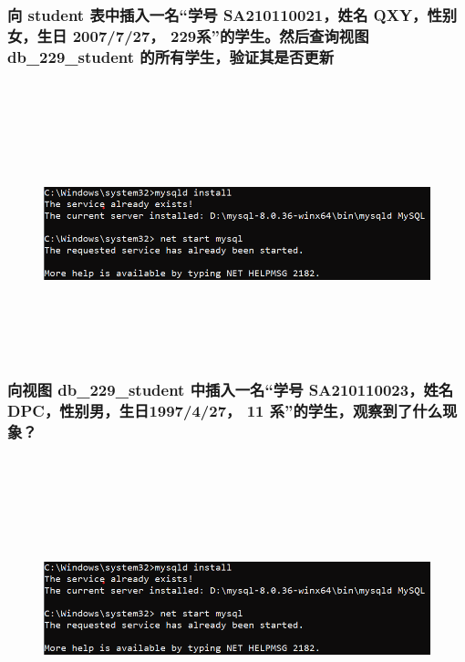\documentclass{ctexart}
\begin{document}
\subsubsection{向 student 表中插入一名“学号 SA210110021，姓名 QXY，性别女，生日 2007/7/27， 229系”的学生。然后查询视图 db\_229\_student 的所有学生，验证其是否更新}
\begin{lstlisting}[language=sql]
	
\end{lstlisting}
\begin{figure}[H]
	\centering 
	\includegraphics[height=7cm,width=14cm]{1.png}
	\end{figure}
\subsubsection{向视图 db\_229\_student 中插入一名“学号 SA210110023，姓名 DPC，性别男，生日1997/4/27， 11 系”的学生，观察到了什么现象？}
\begin{lstlisting}[language=sql]
	
\end{lstlisting}
\begin{figure}[H]
	\centering 
	\includegraphics[height=7cm,width=14cm]{1.png}
	\end{figure}
\end{document}
